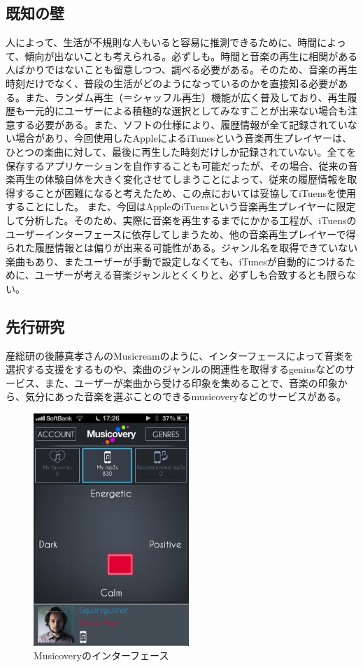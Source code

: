 \documentclass{jsarticle}
\begin{document}
\subsection{既知の壁}
人によって、生活が不規則な人もいると容易に推測できるために、時間によって、傾向が出ないことも考えられる。必ずしも。時間と音楽の再生に相関がある人ばかりではないことも留意しつつ、調べる必要がある。そのため、音楽の再生時刻だけでなく、普段の生活がどのようになっているのかを直接知る必要がある。また、ランダム再生（＝シャッフル再生）機能が広く普及しており、再生履歴も一元的にユーザーによる積極的な選択としてみなすことが出来ない場合も注意する必要がある。また、ソフトの仕様により、履歴情報が全て記録されていない場合があり、今回使用したAppleによるiTunesという音楽再生プレイヤーは、ひとつの楽曲に対して、最後に再生した時刻だけしか記録されていない。全てを保存するアプリケーションを自作することも可能だったが、その場合、従来の音楽再生の体験自体を大きく変化させてしまうことによって、従来の履歴情報を取得することが困難になると考えたため、この点においては妥協してiTuensを使用することにした。
また、今回はAppleのiTuensという音楽再生プレイヤーに限定して分析した。そのため、実際に音楽を再生するまでにかかる工程が、iTuensのユーザーインターフェースに依存してしまうため、他の音楽再生プレイヤーで得られた履歴情報とは偏りが出来る可能性がある。ジャンル名を取得できていない楽曲もあり、またユーザーが手動で設定しなくても、iTunesが自動的につけるために、ユーザーが考える音楽ジャンルとくくりと、必ずしも合致するとも限らない。
\subsection{先行研究}
産総研の後藤真孝さんのMusicreamのように、インターフェースによって音楽を選択する支援をするものや、楽曲のジャンルの関連性を取得するgeniusなどのサービス、また、ユーザーが楽曲から受ける印象を集めることで、音楽の印象から、気分にあった音楽を選ぶことのできるmusicoveryなどのサービスがある。

\begin{figure}[h]
\begin{center}
\includegraphics[width=5.866cm]{musicovery.png}
\caption{Musicoveryのインターフェース}
\label{musicovery_interface}
\end{center}
\end{figure}
\end{document}
